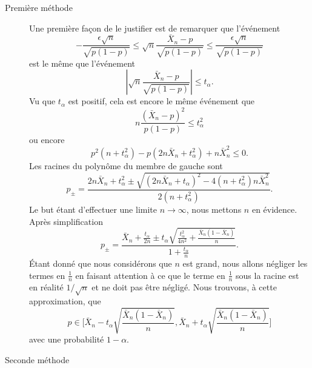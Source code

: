 \begin{description}
    \item[Première méthode] 

Une première façon de le justifier est de remarquer que l'événement 
\begin{equation}
    -\frac{ \epsilon\sqrt{n} }{ \sqrt{p(1-p)} }\leq \sqrt{n}\frac{ \bar X_n-p }{ \sqrt{p(1-p)} }\leq \frac{ \epsilon\sqrt{n} }{ \sqrt{p(1-p)} }
\end{equation}
est le même que l'événement
\begin{equation}
    \left| \sqrt{n}\frac{ \bar X_n-p }{ \sqrt{p(1-p)} } \right| \leq t_{\alpha}.
\end{equation}
Vu que \( t_{\alpha}\) est positif, cela est encore le même événement que
\begin{equation}
    n\frac{ (\bar X_n-p)^2 }{ p(1-p) }\leq t_{\alpha}^2
\end{equation}
ou encore
\begin{equation}
    p^2(n+t_{\alpha}^2)-p(2n\bar X_n+t_{\alpha}^2)+n\bar X_n^2\leq 0.
\end{equation}
Les racines du polynôme du membre de gauche sont
\begin{equation}
    p_{\pm}=\frac{ 2n\bar X_n+t_{\alpha}^2\pm\sqrt{ (2n\bar X_n+t_{\alpha})^2-4(n+t_{\alpha}^2)n\bar X_n^2  } }{ 2(n+t_{\alpha}^2) }.
\end{equation}
Le but étant d'effectuer une limite \( n\to\infty\), nous mettons \( n\) en évidence. Après simplification
\begin{equation}
    p_{\pm}=\frac{ \bar X_n+\frac{ t_{\alpha} }{ 2n }\pm t_{\alpha}\sqrt{\frac{ t_{\alpha}^2 }{ 4n^2 }+\frac{ \bar X_n(1-\bar X_n) }{ n }} }{ 1+\frac{ t_{\alpha} }{ n } }.
\end{equation}
Étant donné que nous considérons que \( n\) est grand, nous allons négliger les termes en \( \frac{1}{ n }\) en faisant attention à ce que le terme en $\frac{1}{ n }$ sous la racine est en réalité \( 1/\sqrt{n}\) et ne doit pas être négligé. Nous trouvons, à cette approximation, que
\begin{equation}
    p\in\mathopen\Big[  \bar X_n-t_{\alpha}\sqrt{\frac{ \bar X_n(1-\bar X_n) }{ n }}  , \bar X_n+t_{\alpha}\sqrt{\frac{ \bar X_n(1-\bar X_n) }{ n }} \mathclose\Big]
\end{equation}
avec une probabilité \( 1-\alpha\).

    \item[Seconde méthode]


\end{description}
